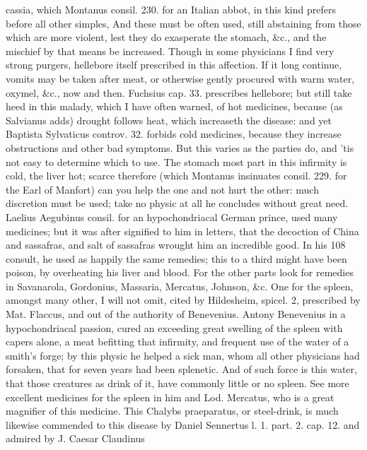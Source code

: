 cassia, which Montanus consil. 230. for an Italian abbot, in this kind
prefers before all other simples, And these must be often used,
still abstaining from those which are more violent, lest they do
exasperate the stomach, \&c., and the mischief by that means be
increased. Though in some physicians I find very strong purgers,
hellebore itself prescribed in this affection. If it long continue,
vomits may be taken after meat, or otherwise gently procured with warm
water, oxymel, \&c., now and then. Fuchsius cap. 33. prescribes
hellebore; but still take heed in this malady, which I have often
warned, of hot medicines, because (as Salvianus adds) drought
follows heat, which increaseth the disease: and yet Baptista Sylvaticus
controv. 32. forbids cold medicines,  because they increase
obstructions and other bad symptoms. But this varies as the parties do,
and 'tis not easy to determine which to use. The stomach most
part in this infirmity is cold, the liver hot; scarce therefore (which
Montanus insinuates consil. 229. for the Earl of Manfort) can you help
the one and not hurt the other: much discretion must be used; take no
physic at all he concludes without great need. Laelius Aegubinus
consil. for an hypochondriacal German prince, used many medicines; but
it was after signified to him in letters, that the decoction of
China and sassafras, and salt of sassafras wrought him an incredible
good. In his 108 consult, he used as happily the same remedies; this to
a third might have been poison, by overheating his liver and blood.
For the other parts look for remedies in Savanarola, Gordonius,
Massaria, Mercatus, Johnson, \&c. One for the spleen, amongst many
other, I will not omit, cited by Hildesheim, spicel. 2, prescribed by
Mat. Flaccus, and out of the authority of Benevenius. Antony Benevenius
in a hypochondriacal passion, cured an exceeding great swelling
of the spleen with capers alone, a meat befitting that infirmity, and
frequent use of the water of a smith's forge; by this physic he helped
a sick man, whom all other physicians had forsaken, that for seven
years had been splenetic. And of such force is this water, that
those creatures as drink of it, have commonly little or no spleen. See
more excellent medicines for the spleen in him and Lod. Mercatus,
who is a great magnifier of this medicine. This Chalybs praeparatus, or
steel-drink, is much likewise commended to this disease by Daniel
Sennertus l. 1. part. 2. cap. 12. and admired by J. Caesar Claudinus
